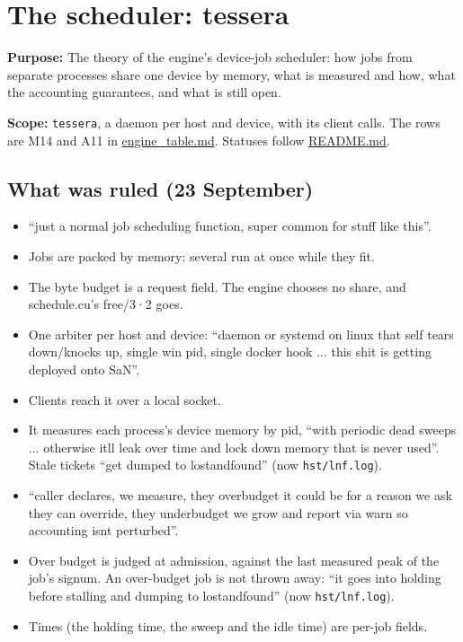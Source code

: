 \chapter{\texorpdfstring{The scheduler: tessera}{The scheduler: tessera}}
\label{chap:tessera-scheduler}

\textbf{Purpose:} The theory of the engine's device-job scheduler: how jobs from separate processes share one device by memory, what is measured and how, what the accounting guarantees, and what is still open.

\textbf{Scope:} \texttt{tessera}, a daemon per host and device, with its client calls. The rows are M14 and A11 in \hyperref[chap:engine-table]{engine\_\allowbreak{}table.md}. Statuses follow \hyperref[chap:readme]{README.md}.

\section{\texorpdfstring{What was ruled (23 September)}{What was ruled (23 September)}}

\begin{itemize}
\item “just a normal job scheduling function, super common for stuff like this”.
\item Jobs are packed by memory: several run at once while they fit.
\item The byte budget is a request field. The engine chooses no share, and schedule.cu's free/3·2 goes.
\item One arbiter per host and device: “daemon or systemd on linux that self tears down/knocks up, single win pid, single docker hook ... this shit is getting deployed onto SaN”.
\item Clients reach it over a local socket.
\item It measures each process's device memory by pid, “with periodic dead sweeps ... otherwise itll leak over time and lock down memory that is never used”. Stale tickets “get dumped to lostandfound” (now \texttt{hst/\allowbreak{}lnf.\allowbreak{}log}).
\item “caller declares, we measure, they overbudget it could be for a reason we ask they can override, they underbudget we grow and report via warn so accounting isnt perturbed”.
\item Over budget is judged at admission, against the last measured peak of the job's signum. An over-budget job is not thrown away: “it goes into holding before stalling and dumping to lostandfound” (now \texttt{hst/\allowbreak{}lnf.\allowbreak{}log}).
\item Times (the holding time, the sweep and the idle time) are per-job fields.
\end{itemize}

